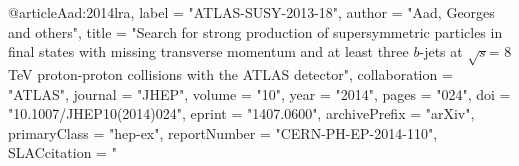 @article{Aad:2014lra,
      label          = "ATLAS-SUSY-2013-18",
      author         = "Aad, Georges and others",
      title          = "{Search for strong production of supersymmetric particles
                        in final states with missing transverse momentum and at
                        least three $b$-jets at $\sqrt{s}$= 8 TeV proton-proton
                        collisions with the ATLAS detector}",
      collaboration  = "ATLAS",
      journal        = "JHEP",
      volume         = "10",
      year           = "2014",
      pages          = "024",
      doi            = "10.1007/JHEP10(2014)024",
      eprint         = "1407.0600",
      archivePrefix  = "arXiv",
      primaryClass   = "hep-ex",
      reportNumber   = "CERN-PH-EP-2014-110",
      SLACcitation   = "%
}

